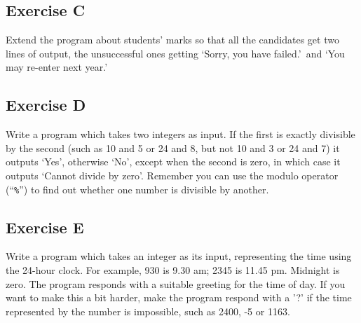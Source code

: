 \subsection*{Exercise C}

Extend the program about students' marks so that all the candidates
get two lines of output, the unsuccessful ones getting `Sorry, you
have failed.'\ and `You may re-enter next year.'

\subsection*{Exercise D}

Write a program which takes two integers as input.
If the first is exactly divisible
by the second (such as 10 and 5 or 24 and 8, but not 10 and 3 or 24 and 7)
it outputs `Yes', otherwise `No', except when the second
is zero, in which case it outputs `Cannot divide by zero'. Remember
you can use the modulo operator (``\texttt{\%}'') to find out whether one
number is divisible by another. 

\subsection*{Exercise E}

Write a program which takes an integer as its input, representing the time
using the 24-hour clock.  For example, 930 is 9.30 am; 2345 is 11.45 pm.  Midnight is
zero. The program responds with a suitable greeting for the time of day.
If you want to make this a bit harder, make the program respond with a '?'
if the time represented by the number is impossible, such as 2400, -5 or
1163.





